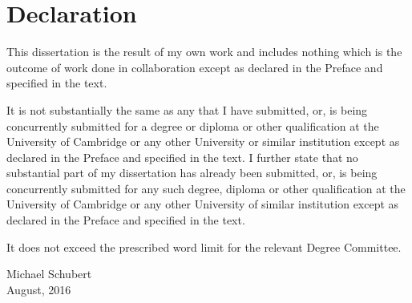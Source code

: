 \chapter*{Declaration}

This dissertation is the result of my own work and includes nothing which is the
outcome of work done in collaboration except as declared in the Preface and
specified in the text.

It is not substantially the same as any that I have submitted, or, is being
concurrently submitted for a degree or diploma or other qualification at the
University of Cambridge or any other University or similar institution except as
declared in the Preface and specified in the text. I further state that no
substantial part of my dissertation has already been submitted, or, is being
concurrently submitted for any such degree, diploma or other qualification at
the University of Cambridge or any other University of similar institution
except as declared in the Preface and specified in the text.

It does not exceed the prescribed word limit for the relevant Degree Committee.

\begin{flushright}
Michael Schubert\\
August, 2016
\end{flushright}
